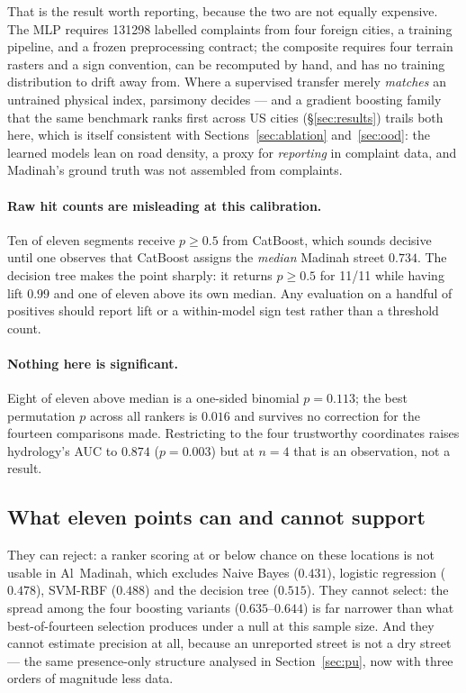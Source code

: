\documentclass[11pt]{article}
\begin{document}
That is the result worth reporting, because the two are not equally expensive.
The MLP requires \num{131298} labelled complaints from four foreign cities, a
training pipeline, and a frozen preprocessing contract; the composite requires
four terrain rasters and a sign convention, can be recomputed by hand, and has no
training distribution to drift away from. Where a supervised transfer merely
\emph{matches} an untrained physical index, parsimony decides --- and a gradient
boosting family that the same benchmark ranks first across US cities
(\S\ref{sec:results}) trails both here, which is itself consistent with
Sections~\ref{sec:ablation} and~\ref{sec:ood}: the learned models lean on road
density, a proxy for \emph{reporting} in complaint data, and Madinah's ground
truth was not assembled from complaints.

\paragraph{Raw hit counts are misleading at this calibration.} Ten of eleven
segments receive $p \ge 0.5$ from CatBoost, which sounds decisive until one
observes that CatBoost assigns the \emph{median} Madinah street $0.734$. The
decision tree makes the point sharply: it returns $p \ge 0.5$ for 11/11 while
having lift $0.99$ and one of eleven above its own median. Any evaluation on a
handful of positives should report lift or a within-model sign test rather than
a threshold count.

\paragraph{Nothing here is significant.} Eight of eleven above median is a
one-sided binomial $p = 0.113$; the best permutation $p$ across all rankers is
$0.016$ and survives no correction for the fourteen comparisons made. Restricting to
the four trustworthy coordinates raises hydrology's AUC to $0.874$ ($p=0.003$)
but at $n=4$ that is an observation, not a result.

\subsection{What eleven points can and cannot support}

They can reject: a ranker scoring at or below chance on these locations is not
usable in Al~Madinah, which excludes Naive Bayes ($0.431$), logistic regression
($0.478$), SVM-RBF ($0.488$) and the decision tree ($0.515$). They cannot select: the spread among the four boosting variants
($0.635$--$0.644$) is far narrower than what best-of-fourteen selection produces under
a null at this sample size. And they cannot estimate precision at all, because
an unreported street is not a dry street --- the same presence-only structure
analysed in Section~\ref{sec:pu}, now with three orders of magnitude less data.
\end{document}
